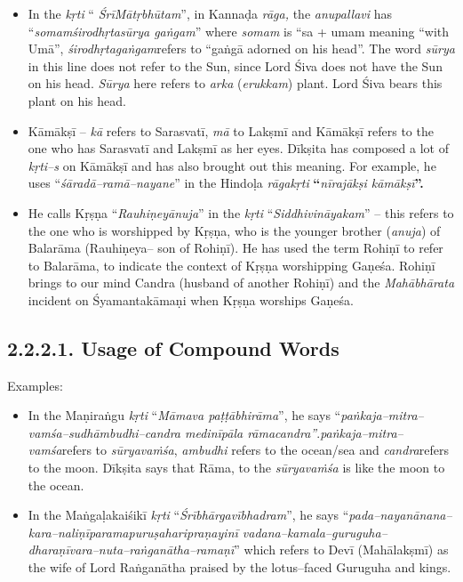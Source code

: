 \begin{itemize}
\item In the \textit{kṛti} “ \textit{ŚrīMātṛbhūtam}”, in Kannaḍa \textit{rāga,} the \textit{anupallavi} has “\textit{somamśirodhṛtasūrya gaṅgam}” where \textit{somam} is “sa + umam meaning “with Umā”, \textit{ śirodhṛtagaṅgam}refers to “gaṅgā adorned on his head”. The word \textit{sūrya} in this line does not refer to the Sun, since Lord Śiva does not have the Sun on his head. \textit{Sūrya} here refers to \textit{arka} (\textit{erukkam}) plant. Lord Śiva bears this plant on his head.

 \item Kāmākṣī – \textit{kā} refers to Sarasvatī, \textit{mā} to Lakṣmī and Kāmākṣī refers to the one who has Sarasvatī and Lakṣmī as her eyes. Dīkṣita has composed a lot of \textit{kṛti–s} on Kāmākṣī and has also brought out this meaning. For example, he uses “\textit{śāradā–ramā–nayane}” in the Hindoḷa\textit{ rāgakṛti} \textbf{“}\textit{nīrajākṣi kāmākṣī}\textbf{”.}

 \item He calls Kṛṣṇa “\textit{Rauhiṇeyānuja}” in the \textit{kṛti} “\textit{Siddhivināyakam}” – this refers to the one who is worshipped by Kṛṣṇa, who is the younger brother (\textit{anuja}) of Balarāma (Rauhiṇeya– son of Rohiṇī). He has used the term Rohiṇī to refer to Balarāma, to indicate the context of Kṛṣṇa worshipping Gaṇeśa. Rohiṇī brings to our mind Candra (husband of another Rohiṇī) and the \textit{Mahābhārata} incident on Śyamantakāmaṇi when Kṛṣṇa worships Gaṇeśa.

\end{itemize}


\subsection*{2.2.2.1. Usage of Compound Words}

Examples:

\begin{itemize}
\item In the Maṇiraṅgu \textit{kṛti} “\textit{Māmava paṭṭābhirāma}”, he says “\textit{paṅkaja–mitra–vamśa–sudhāmbudhi–candra medinīpāla rāmacandra”}.\textit{paṅkaja–mitra–vamśa}refers to \textit{sūryavaṁśa}, \textit{ambudhi} refers to the ocean/sea and \textit{ candra}refers to the moon. Dīkṣita says that Rāma, to the \textit{sūryavaṁśa} is like the moon to the ocean.

 \item In the Maṅgaḷakaiśikī \textit{kṛti} “\textit{Śrībhārgavībhadram}”, he says “\textit{pada–nayanānana–kara–naliṇīparamapuruṣaharipraṇayinī vadana–kamala–guruguha–dharaṇīvara–nuta–raṅganātha–ramaṇī}” which refers to Devī (Mahālakṣmī) as the wife of Lord Raṅganātha praised by the lotus–faced Guruguha and kings.

\end{itemize}


